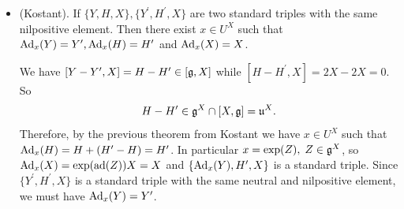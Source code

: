 \begin{itemize}
Now, since $\bigoplus_{\geq j+2}\fr{g}_i^X\subset\Ker (p_{j+1})$, we get 
\begin{equation}
    \begin{split}
        &p_{j+1}\Ad_{\exp(Z_j)}\left(Ad_{\exp(Z_{j+1}^\prime)/(j+1)}H-H\right)\\
        &=p_{j+1}\Ad_{\exp(Z_j)}(\frac{[Z_{j+1}^\prime,H]}{j+1})\quad([H,Z_{j+1}^\prime]=(j+1)Z_{j+1}^\prime)\\
        &=-(j+1)\frac{Z_{j+1}^\prime}{j+1}\quad(Z_{j+1}^\prime\in\fr{g}_{j+1}^X)\\
        &=-Z_{j+1}^\prime
    \end{split}
\end{equation}
Therefore, we have
\begin{equation}
    \Ad_{\exp(Z_{j+1})}H-H-W=-Z_{j+1}^\prime+\Ad_{\exp(Z_j)}H-H-W\;\text{ mod }\bigoplus_{\geq j+2}\fr{g}_i^X
\end{equation}
which implies that $p_{j+1}(\Ad_{\exp(Z_{j+1})}H-H-W)=0$. The induction hypothesis yields 
$\Ad_{\exp(Z_j)}H-H-W\in\bigoplus_{i=j+1}^{m}\fr{g}_i^X$. From this, we conclude the induction step.

\item (Kostant). If $\{Y,H,X\},\{Y^\prime,H^\prime,X\}$ are two standard triples with the same nilpositive element. Then 
there exist $x\in U^X$ such that $\text{Ad}_x(Y)=Y^\prime,\text{Ad}_x(H)=H^\prime$ and $\text{Ad}_x(X)=X$.\par
We have $[Y-Y^\prime,X]=H-H^\prime\in[\mathfrak{g},X]$ while $[H-H^\prime, X]=2X-2X=0$. So 
\begin{equation}
    H-H^\prime\in\mathfrak{g}^X\cap[X,\mathfrak{g}]=\mathfrak{u}^X.
\end{equation} 
Therefore, by the previous theorem from Kostant we have $x\in U^X$ such that $\text{Ad}_x(H)=H+(H^\prime-H)=H^\prime$. In particular
$x=\exp(Z),\;Z\in\mathfrak{g}^X$, so $\text{Ad}_x(X)=\exp(\text{ad}(Z))X=X$ and $\{\text{Ad}_x(Y),H^\prime, X\}$ is a standard triple. Since 
$\{Y^\prime,H^\prime,X\}$ is a standard triple with the same neutral and nilpositive element, we must have $\text{Ad}_x(Y)=Y^\prime$.


\end{itemize}
